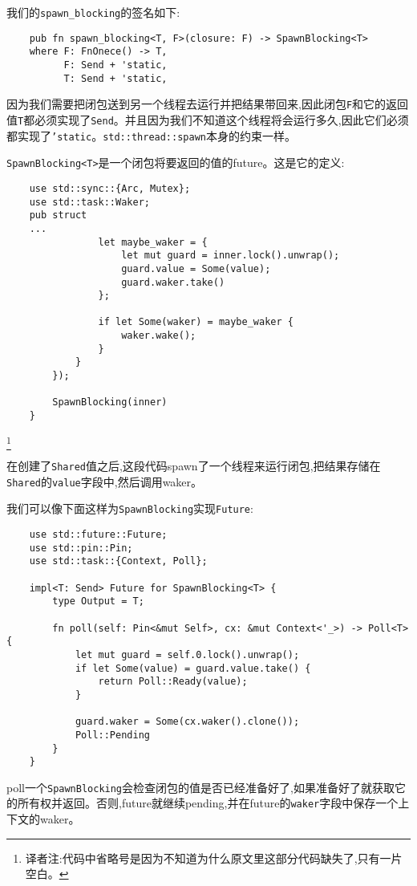 我们的\texttt{spawn\_blocking}的签名如下:
\begin{verbatim}
    pub fn spawn_blocking<T, F>(closure: F) -> SpawnBlocking<T>
    where F: FnOnece() -> T,
          F: Send + 'static,
          T: Send + 'static,
\end{verbatim}

因为我们需要把闭包送到另一个线程去运行并把结果带回来,因此闭包\texttt{F}和它的返回值\texttt{T}都必须实现了\texttt{Send}。并且因为我们不知道这个线程将会运行多久,因此它们必须都实现了\texttt{'static}。\texttt{std::thread::spawn}本身的约束一样。

\texttt{SpawnBlocking<T>}是一个闭包将要返回的值的future。这是它的定义:
\begin{verbatim}
    use std::sync::{Arc, Mutex};
    use std::task::Waker;
    pub struct
    ...
                let maybe_waker = {
                    let mut guard = inner.lock().unwrap();
                    guard.value = Some(value);
                    guard.waker.take()
                };

                if let Some(waker) = maybe_waker {
                    waker.wake();
                }
            }
        });

        SpawnBlocking(inner)
    }
\end{verbatim}
\footnote{译者注:代码中省略号是因为不知道为什么原文里这部分代码缺失了,只有一片空白。}

在创建了\texttt{Shared}值之后,这段代码spawn了一个线程来运行闭包,把结果存储在\texttt{Shared}的\texttt{value}字段中,然后调用waker。

我们可以像下面这样为\texttt{SpawnBlocking}实现\texttt{Future}:
\begin{verbatim}
    use std::future::Future;
    use std::pin::Pin;
    use std::task::{Context, Poll};

    impl<T: Send> Future for SpawnBlocking<T> {
        type Output = T;

        fn poll(self: Pin<&mut Self>, cx: &mut Context<'_>) -> Poll<T> {
            let mut guard = self.0.lock().unwrap();
            if let Some(value) = guard.value.take() {
                return Poll::Ready(value);
            }

            guard.waker = Some(cx.waker().clone());
            Poll::Pending
        }
    }
\end{verbatim}

poll一个\texttt{SpawnBlocking}会检查闭包的值是否已经准备好了,如果准备好了就获取它的所有权并返回。否则,future就继续pending,并在future的\texttt{waker}字段中保存一个上下文的waker。

